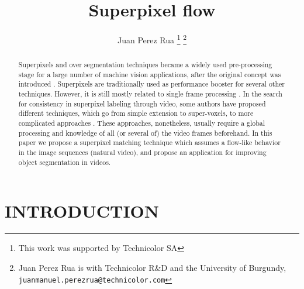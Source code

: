 \documentclass[a4paper, 10pt, conference]{ieeeconf}      %
\title{\LARGE \bf
Superpixel flow
}
\author{Juan Perez Rua%
\thanks{This work was supported by Technicolor SA}%
\thanks{Juan Perez Rua  is with Technicolor R\&D and the University of Burgundy,
        {\tt\small juanmanuel.perezrua@technicolor.com}}%
}
\begin{document}
\maketitle
\thispagestyle{empty}
\pagestyle{empty}


\begin{abstract}

Superpixels and over segmentation techniques
became a widely used pre-processing stage for a
large number of machine vision applications, after the
original concept was introduced \cite{c1}. Superpixels are
traditionally used as performance booster for several
other techniques. However, it is still mostly related to
single frame processing \cite{c1}\cite{c10}\cite{c11}. In the search for
consistency in superpixel labeling through video,
some authors have proposed different techniques,
which go from simple extension to super-voxels\cite{c9}\cite{c11},
to more complicated approaches \cite{c8}. These
approaches, nonetheless, usually require a global
processing and knowledge of all (or several of) the
video frames beforehand. In this paper we propose a superpixel
matching technique which assumes a flow-like
behavior in the image sequences (natural video), and
propose an application for improving object segmentation in videos.


\end{abstract}


\section{INTRODUCTION}
\end{document}
